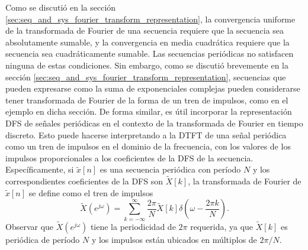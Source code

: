\documentclass[a4paper]{report}
\begin{document}
Como se discutió en la sección \ref{sec:seq_and_sys_fourier_transform_representation}, la convergencia uniforme de la transformada de Fourier de una secuencia requiere que la secuencia sea absolutamente sumable, y la convergencia en media cuadrática requiere que la secuencia sea cuadráticamente sumable. Las secuencias periódicas no satisfacen ninguna de estas condiciones. Sin embargo, como se discutió brevemente en la sección \ref{sec:seq_and_sys_fourier_transform_representation}, secuencias que pueden expresarse como la suma de exponenciales complejas pueden considerarse tener transformada de Fourier de la forma de un tren de impulsos, como en el ejemplo en dicha sección. De forma similar, es útil incorporar la representación DFS de señales periódicas en el contexto de la transformada de Fourier en tiempo discreto. Esto puede hacerse interpretando a la DTFT de una señal periódica como un tren de impulsos en el dominio de la frecuencia, con los valores de los impulsos proporcionales a los coeficientes de la DFS de la secuencia. Específicamente, si \(\tilde{x}[n]\) es una secuencia periódica con período \(N\) y los correspondientes coeficientes de la DFS son \(\tilde{X}[k]\), la transformada de Fourier de \(\tilde{x}[n]\) se define como el tren de impulsos 
\begin{equation}\label{eq:dft_dtft_periodic_signal}
 \tilde{X}(e^{j\omega})=\sum_{k=-\infty}^\infty\frac{2\pi}{N}\tilde{X}[k]\delta\left(\omega-\frac{2\pi k}{N}\right).
\end{equation}
Observar que \(\tilde{X}(e^{j\omega})\) tiene la periodicidad de \(2\pi\) requerida, ya que \(\tilde{X}[k]\) es periódica de período \(N\) y los impulsos están ubicados en múltiplos de \(2\pi/N\).
\end{document}
